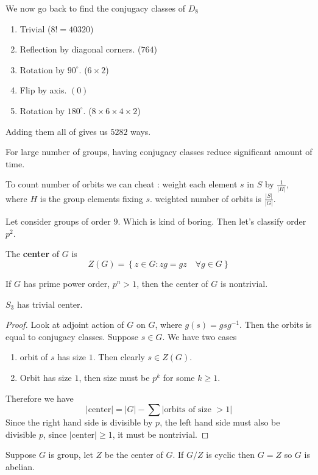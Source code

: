 We now go back to find the conjugacy classes of $D_8$
\begin{enumerate}
	\item Trivial ($8! = 40320$)
	\item Reflection by diagonal corners. ($764$)
	\item Rotation by $90^\circ$. ($6 \times 2$)
	\item Flip by axis. $(0)$
	\item Rotation by $180^\circ$. ($8 \times 6 \times 4 \times 2$)
\end{enumerate}
Adding them all of gives us $5282$ ways.
\begin{remark}
	For large number of groups, having conjugacy classes reduce significant amount of time.
\end{remark}
\begin{remark}
	To count number of orbits we can cheat : weight each element $s$ in $S$ by $\frac{1}{|H|}$, where $H$ is the group elements fixing $s$.
	weighted number of orbits is $\frac{|S|}{|G|}$.
\end{remark}
Let consider groups of order $9$. Which is kind of boring. Then let's classify order $p^2$.
\begin{definition}
	The \textbf{center} of $G$ is 
	\[ Z(G) = \left\{ z \in G : zg = gz \quad \forall g \in G \right\}\]
\end{definition}
\begin{theorem}
	If $G$ has prime power order, $p^n > 1$, then the center of $G$ is nontrivial.
\end{theorem}
\begin{example}
	$S_3$ has trivial center.
\end{example}
\begin{proof}
	Look at adjoint action of $G$ on $G$, where $g(s) = gsg^{-1}$. Then the orbits is equal to conjugacy classes. Suppose $s \in G$. We have two cases
	\begin{enumerate}
		\item orbit of $s$ has size $1$. Then clearly $s \in Z(G)$.
		\item Orbit has size $1$, then size must be $p^k$ for some $k \geq 1$.
	\end{enumerate}
	Therefore we have
	\[ |\mathrm{center}| = |G| - \sum |\text{orbits of size $> 1$}|\]
	Since the right hand side is divisible by $p$, the left hand side must also be divisible $p$, since $|\mathrm{center}| \geq 1$, it must be nontrivial.
\end{proof}
\begin{lemma}
	Suppose $G$ is group, let $Z$ be the center of $G$. If $G/Z$ is cyclic then $G = Z$ so $G$ is abelian.
\end{lemma}
